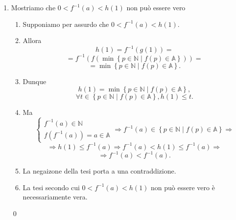 \begin{demonstration}
\begin{enumerate}[label=(\roman*)]
\begin{enumerate}[label=\arabic*.]
            \item Mostriamo che $0<f^{-1}\left(a\right) < h\left(1\right)$ non può essere vero
            \begin{enumerate}[label=\arabic{enumii}.\arabic*.]
                \item Supponiamo per assurdo che $0<f^{-1}\left(a\right) < h\left(1\right)$.
                \item Allora
                    \[ h\left(1\right)=f^{-1}\left(g\left(1\right)\right)= \]
                    \[ =f^{-1}\left(f\left(\min \left\{p\in\mathbb{N}\mid f\left(p\right)\in\mathbb{A}\right\}\right)\right)= \]
                    \[ =\min \left\{p\in\mathbb{N}\mid f\left(p\right)\in\mathbb{A}\right\}. \]
                \item Dunque
                    \[ h\left(1\right) = \min \left\{p\in\mathbb{N}\mid f\left(p\right)\in\mathbb{A}\right\}, \]
                    \[ \forall t \in \left\{p\in\mathbb{N}\mid f\left(p\right)\in\mathbb{A}\right\}, h\left(1\right)\leq t.\]
                \item Ma
                    \[
                        \begin{cases}
                            f^{-1}\left(a\right)\in\mathbb{N} \\
                            f\left(f^{-1}\left(a\right)\right)=a\in\mathbb{A}
                        \end{cases} \Rightarrow f^{-1}\left(a\right)\in\left\{p\in\mathbb{N}\mid f\left(p\right)\in\mathbb{A}\right\}\Rightarrow
                    \]\[\Rightarrow h\left(1\right) \leq f^{-1}\left(a\right)\Rightarrow f^{-1}\left(a\right) < h \left(1\right) \leq f^{-1}\left(a\right) \Rightarrow
                    \]\[
                        \Rightarrow f^{-1}\left(a\right) < f^{-1}\left(a\right).
                    \]

                \item La negaizone della tesi porta a una contraddizione.
                \item La tesi secondo cui $0<f^{-1}\left(a\right) < h\left(1\right)$ non può essere vero è necessariamente vera.
                
            \end{enumerate}
            \qed


\end{enumerate}
\end{enumerate}
\end{demonstration}
